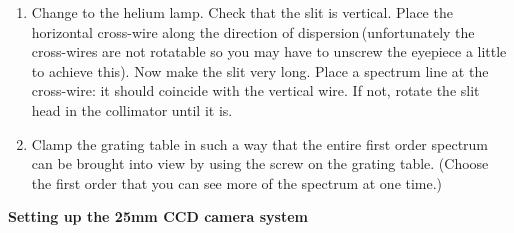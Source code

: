 \documentclass[12pt]{article}
\begin{document}
\begin{enumerate}
\item Change to the helium lamp. Check that the slit is vertical. Place the horizontal cross-wire along the direction of dispersion\,(unfortunately the cross-wires are not rotatable so you may have to  unscrew the eyepiece a little to achieve this). Now make the slit very long. Place a spectrum line at the cross-wire: it should coincide with the vertical wire. If not, rotate the slit head in the collimator until it is.

\item Clamp the grating table in such a way that the entire first order spectrum can be  brought into view by using the screw on the grating table. (Choose the first order that you can see more of the spectrum at one time.)

\end{enumerate}

\newpage




{\bf Setting up the 25mm CCD camera system}

\begin{center}
\end{center}
\end{document}
